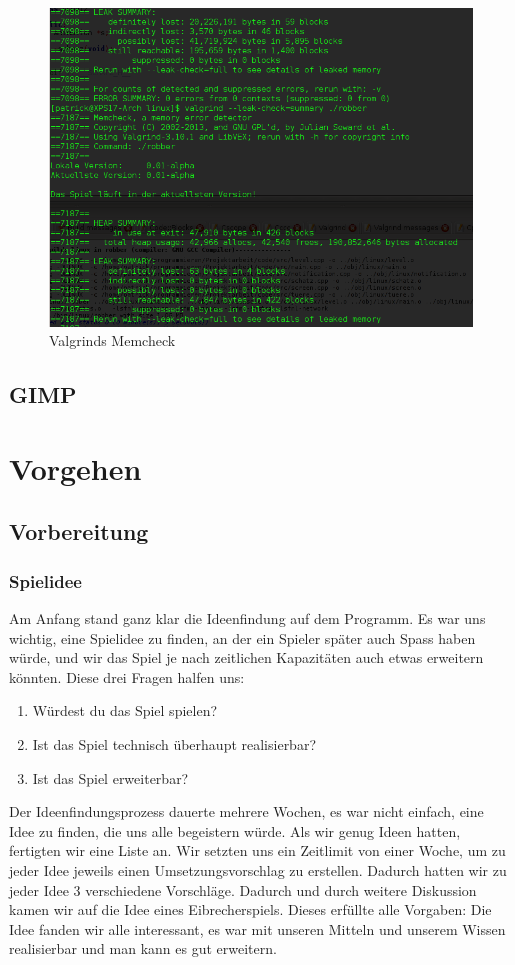 \documentclass[12pt,a4paper]{scrartcl}
\begin{document}
\begin{figure}
\centering
\includegraphics[scale=0.8]{img/valgrind2.png}
\caption{Valgrinds Memcheck}
\end{figure}


\subsection{GIMP}

\newpage
\section{Vorgehen}
\subsection{Vorbereitung}
\subsubsection{Spielidee}
Am Anfang stand ganz klar die Ideenfindung auf dem Programm. Es war uns wichtig,
eine Spielidee zu finden, an der ein Spieler später auch Spass haben würde,
und wir das Spiel je nach zeitlichen Kapazitäten auch etwas erweitern könnten.
Diese drei Fragen halfen uns:
\begin{enumerate}
\item Würdest du das Spiel spielen?
\item Ist das Spiel technisch überhaupt realisierbar?
\item Ist das Spiel erweiterbar?
\end{enumerate}
Der Ideenfindungsprozess dauerte mehrere Wochen, es war nicht einfach, eine Idee
zu finden, die uns alle begeistern würde. 
Als wir genug Ideen hatten, fertigten wir eine Liste an. 
Wir setzten uns ein Zeitlimit von einer Woche, um zu jeder Idee jeweils einen Umsetzungsvorschlag zu erstellen. 
Dadurch hatten wir zu jeder Idee 3 verschiedene Vorschläge.
Dadurch und durch weitere Diskussion kamen wir auf die Idee eines Eibrecherspiels.
Dieses erfüllte alle Vorgaben:
Die Idee fanden wir alle interessant, es war mit unseren Mitteln und unserem Wissen realisierbar und man kann es gut erweitern.
\end{document}
